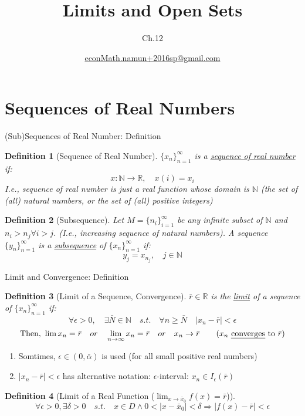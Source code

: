 \documentclass[a4paper,11pt]{article}
\author[조남운]{\url{econMath.namun+2016sp@gmail.com}}
\title{Limits and Open Sets}
\subtitle{Ch.12}
\newtheorem{defn}{Definition}
\begin{document}
	
\maketitle


\section{Sequences of Real Numbers} %
\label{sec:sequences_of_real_numbers}
\begin{frame}[t]{(Sub)Sequences of Real Number: Definition}
	\begin{defn}
		[Sequence of Real Number]
		$\{x_n\}_{n=1}^\infty$ is a \uline{sequence of real number} if:
		\[
			x:\mathbb{N}\rightarrow \mathbb{R},\quad x(i) = x_i 
		\]
		\textit{I.e.,} sequence of real number is just a real function whose domain is $\mathbb{N}$ (the set of (all) natural numbers, or the set of (all) positive integers)
	\end{defn}
	\begin{defn}
		[Subsequence]
		Let $M=\{n_i\}_{i=1}^\infty$ be any infinite subset of $\mathbb{N}$ and $n_i > n_j \forall i>j$. (\textit{I.e.}, increasing sequence of natural numbers). A sequence $\{y_n\}_{n=1}^\infty$ is a \uline{subsequence} of $\{x_n\}_{n=1}^\infty$ if:\[
			y_j = x_{n_j},\quad j\in\mathbb{N}
		\]
	\end{defn}

\end{frame}

\begin{frame}[t]{Limit and Convergence: Definition}
	\begin{defn}
		[Limit of a Sequence, Convergence]
		$\bar r\in \mathbb{R}$ is the \uline{limit} of a sequence of $\{x_n\}_{n=1}^\infty$ if:
		\[
			\forall \epsilon>0,\quad \exists \bar N\in\mathbb{N} \quad s.t.\quad \forall n\ge\bar N \quad |x_n - \bar r|<\epsilon
		\]\[
			\text{Then, } \lim x_n = \bar r \quad or\quad \lim_{n\rightarrow\infty}x_n = \bar r\quad or\quad x_n \rightarrow \bar r \tag{$x_n$ \uline{converges} to $\bar r$}
		\]
	\end{defn}
	\begin{enumerate}[Note 1:]
		\item Somtimes, $\epsilon\in(0,\bar\alpha)$ is used (for all small positive real numbers)
		\item $|x_n - \bar r|<\epsilon$ has alternative notation: $\epsilon$-interval: $x_n \in I_\epsilon(\bar r )$
	\end{enumerate}
	\begin{defn}
		[Limit of a Real Function ($\lim_{x\rightarrow \bar x_0} f(x)= \bar r $)]
		\[
		 \forall \epsilon>0,\exists \delta>0 \quad s.t.\quad x\in D\land 0<|x-\bar x_0 |<\delta \Rightarrow  |f(x)-\bar r |<\epsilon
		\]
	\end{defn}
\end{frame}
\end{document}

